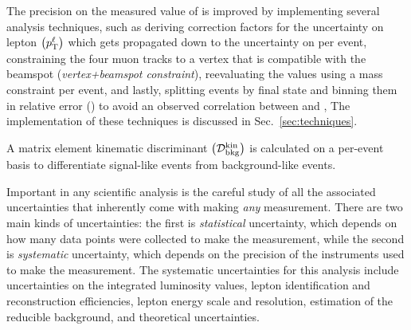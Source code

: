 The precision on the measured value of \mH is improved by implementing several analysis techniques, such as
deriving correction factors for the uncertainty on lepton \pt $\left( p_{\mathrm{T}}^{\ell} \right)$ which gets propagated down to the uncertainty on \mfourl per event,
constraining the four muon tracks to a vertex that is compatible with the beamspot (\emph{vertex+beamspot constraint}),
reevaluating the \ptl values using a \Zone mass constraint per event,
and lastly, splitting events by final state and binning them in relative \mfourl error (\relmfourlerrflat) to avoid an observed correlation between \relmfourlerrflat and \Dkinbkg,
The implementation of these techniques is discussed in Sec.~\ref{sec:techniques}.


A matrix element kinematic discriminant $\left( \mathcal{D}^{\text{kin}}_{\text{bkg}} \right)$ is calculated on a per-event basis to differentiate signal-like events from background-like events.

Important in any scientific analysis is the careful study of all the associated uncertainties that inherently come with making \emph{any} measurement.
There are two main kinds of uncertainties:
the first is \emph{statistical} uncertainty, which depends on how many data points were collected to make the measurement,
while the second is \emph{systematic} uncertainty, which depends on the precision of the instruments used to make the measurement.
The systematic uncertainties for this analysis include uncertainties on the integrated luminosity values, lepton identification and reconstruction efficiencies, lepton energy scale and resolution, estimation of the reducible background, and theoretical uncertainties.

